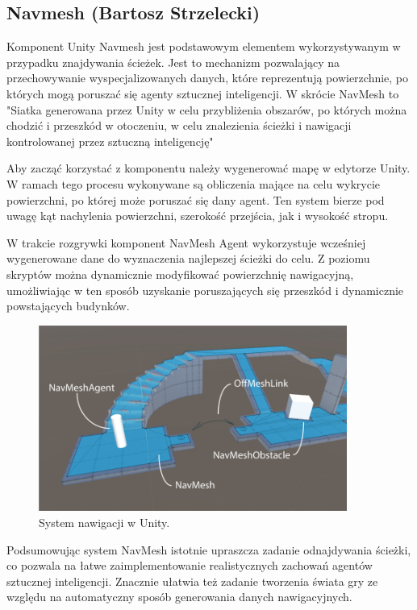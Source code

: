 \subsection{Navmesh (Bartosz Strzelecki)}

Komponent Unity Navmesh jest podstawowym elementem wykorzystywanym w przypadku znajdywania ścieżek.
Jest to mechanizm pozwalający na przechowywanie wyspecjalizowanych danych, które reprezentują
powierzchnie, po których mogą poruszać się agenty sztucznej inteligencji.
W skrócie NavMesh to "Siatka generowana przez Unity w celu przybliżenia obszarów, po których można chodzić i przeszkód w otoczeniu, w celu znalezienia ścieżki i nawigacji kontrolowanej przez sztuczną inteligencję"\cite{unity}

Aby zacząć korzystać z komponentu należy wygenerować mapę w edytorze Unity.
W ramach tego procesu wykonywane są obliczenia mające na celu wykrycie powierzchni,
po której może poruszać się dany agent. Ten system bierze pod uwagę kąt nachylenia
powierzchni, szerokość przejścia, jak i wysokość stropu.

W trakcie rozgrywki komponent NavMesh Agent wykorzystuje wcześniej wygenerowane dane
do wyznaczenia najlepszej ścieżki do celu. Z poziomu skryptów można dynamicznie modyfikować powierzchnię
nawigacyjną, umożliwiając w ten sposób uzyskanie poruszających się przeszkód i dynamicznie powstających budynków.

\begin{figure}[h!]
    \centering
    \includegraphics[width=0.9\textwidth]{images/navmesh.png}
    \caption{System nawigacji w Unity.}
\end{figure}

Podsumowując system NavMesh istotnie upraszcza zadanie odnajdywania ścieżki, co pozwala na łatwe zaimplementowanie
realistycznych zachowań agentów sztucznej inteligencji. Znacznie ułatwia też zadanie tworzenia świata gry ze względu na automatyczny
sposób generowania danych nawigacyjnych.

